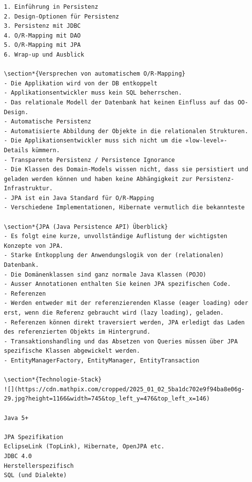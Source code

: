 \documentclass[10pt]{article}
\begin{document}
\begin{verbatim}
1. Einführung in Persistenz
2. Design-Optionen für Persistenz
3. Persistenz mit JDBC
4. O/R-Mapping mit DAO
5. O/R-Mapping mit JPA
6. Wrap-up und Ausblick

\section*{Versprechen von automatischem O/R-Mapping}
- Die Applikation wird von der DB entkoppelt
- Applikationsentwickler muss kein SQL beherrschen.
- Das relationale Modell der Datenbank hat keinen Einfluss auf das OO-Design.
- Automatische Persistenz
- Automatisierte Abbildung der Objekte in die relationalen Strukturen.
- Die Applikationsentwickler muss sich nicht um die «low-level»-Details kümmern.
- Transparente Persistenz / Persistence Ignorance
- Die Klassen des Domain-Models wissen nicht, dass sie persistiert und geladen werden können und haben keine Abhängigkeit zur Persistenz-Infrastruktur.
- JPA ist ein Java Standard für O/R-Mapping
- Verschiedene Implementationen, Hibernate vermutlich die bekannteste

\section*{JPA (Java Persistence API) Überblick}
- Es folgt eine kurze, unvollständige Auflistung der wichtigsten Konzepte von JPA.
- Starke Entkopplung der Anwendungslogik von der (relationalen) Datenbank.
- Die Domänenklassen sind ganz normale Java Klassen (POJO)
- Ausser Annotationen enthalten Sie keinen JPA spezifischen Code.
- Referenzen
- Werden entweder mit der referenzierenden Klasse (eager loading) oder erst, wenn die Referenz gebraucht wird (lazy loading), geladen.
- Referenzen können direkt traversiert werden, JPA erledigt das Laden des referenzierten Objekts im Hintergrund.
- Transaktionshandling und das Absetzen von Queries müssen über JPA spezifische Klassen abgewickelt werden.
- EntityManagerFactory, EntityManager, EntityTransaction

\section*{Technologie-Stack}
![](https://cdn.mathpix.com/cropped/2025_01_02_5ba1dc702e9f94ba8e06g-29.jpg?height=1166&width=745&top_left_y=476&top_left_x=146)

Java 5+

JPA Spezifikation
EclipseLink (TopLink), Hibernate, OpenJPA etc.
JDBC 4.0
Herstellerspezifisch
SQL (und Dialekte)


\end{verbatim}
\end{document}
